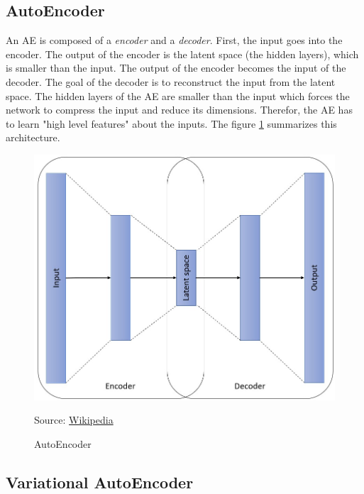 \documentclass[12pt]{report}
\begin{document}
\subsection{AutoEncoder}
\label{sec:back:ae}

An AE \cite{moor_topological_2020, tschannen_recent_2018, rudolph_structuring_2019} is composed of a \textit{encoder} and a \textit{decoder}.
First, the input goes into the encoder.
The output of the encoder is the latent space (the hidden layers), which is smaller than the input.
The output of the encoder becomes the input of the decoder.
The goal of the decoder is to reconstruct the input from the latent space.
The hidden layers of the AE are smaller than the input which forces the network to compress the input and reduce its dimensions.
Therefor, the AE has to learn "high level features" about the inputs.
The figure \ref{fig:autoencoder} summarizes this architecture.

\begin{figure}[H]
    \centering
    \includegraphics[width=0.9 \textwidth]{images/nn/architectures/autoencoder.jpg}
    \caption{AutoEncoder}
    Source: \href{https://commons.wikimedia.org/wiki/File:Autoencoder_structure.png}{Wikipedia}
    \label{fig:autoencoder}
\end{figure}

\subsection{Variational AutoEncoder}
\label{sec:back:vae}

\end{document}
